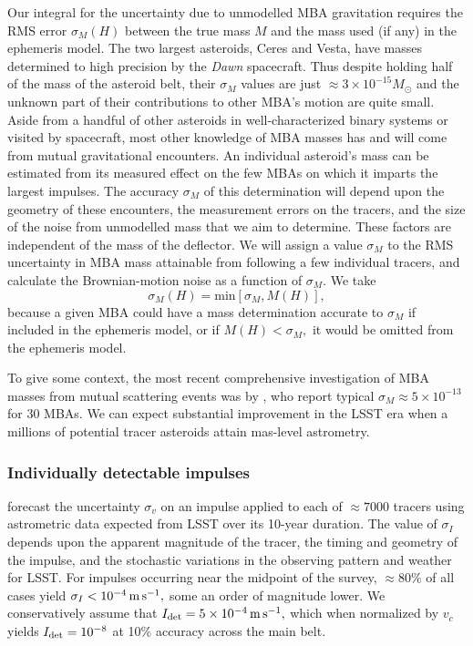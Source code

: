 \documentclass[linenumbers, onecolumn]{aastex631}
\begin{document}
Our integral for the uncertainty due to unmodelled MBA gravitation
requires the RMS error $\sigma_M(H)$ between the true mass $M$ and the
mass used (if any) in the ephemeris model.
The two largest asteroids, Ceres and Vesta, have masses determined to
high precision by the \textit{Dawn} spacecraft.  Thus despite holding
half of the mass of the asteroid belt, their $\sigma_M$ values are just
$\approx3\times10^{-15} M_\odot$ and
the unknown part of their contributions to other MBA's motion are
quite small.  Aside from a handful of other asteroids in
well-characterized binary systems or visited by spacecraft, most other knowledge of MBA masses
has and will come from mutual gravitational encounters.   An
individual asteroid's mass can be estimated from its measured effect  on the
few MBAs on which it imparts the largest impulses.  The accuracy
$\sigma_M$ of this determination will depend upon the geometry of
these encounters, the measurement errors on the tracers, and the size
of the noise from unmodelled mass that we aim to determine.  These
factors are independent of the mass of the deflector.  We will
assign a value $\sigma_M$ to the RMS uncertainty in MBA mass
attainable from following a few individual tracers, and calculate
the Brownian-motion noise as a function of $\sigma_M.$  We take
\begin{equation}
  \sigma_M(H) = \textrm{min}\left[ \sigma_M, M(H) \right],
\end{equation}
because a given MBA could have a mass determination accurate to
$\sigma_M$ if included in the ephemeris model, or if $M(H)<\sigma_M,$
it would be omitted from the ephemeris model.

To give some context, the most recent
comprehensive investigation of MBA masses from mutual scattering
events was by \citet{baer}, who report typical $\sigma_M\approx
5\times10^{-13}$ for 30 MBAs.  We can expect substantial improvement
in the LSST era when a millions of potential tracer asteroids attain
mas-level astrometry.



\subsubsection{Individually detectable impulses}
\citet{negin} forecast the uncertainty $\sigma_v$ on an impulse 
applied to each of $\approx7000$ tracers using astrometric data expected from LSST
over its 10-year duration.  The value of $\sigma_I$ depends upon the
apparent magnitude of the tracer, the timing and geometry of the
impulse, and the stochastic variations in the observing pattern and
weather for LSST.
For impulses occurring near the midpoint
of the survey, $\approx80\%$ of all cases yield $\sigma_I<10^{-4}\,{\rm m}\,{\rm
  s}^{-1},$ some an order of magnitude lower.  We conservatively
assume that $I_{\rm det}=5\times 10^{-4}\,{\rm m}\,{\rm
  s}^{-1},$ which when normalized by $v_c$ yields $I_{\rm
  det}=10^{-8}$ at 10\% accuracy across the main belt.
\end{document}
